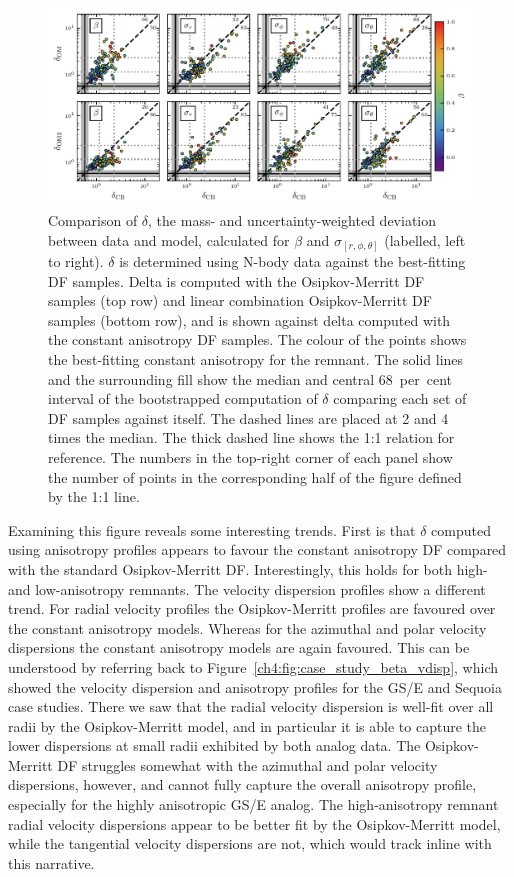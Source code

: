 \begin{figure}
    \centering
    \includegraphics[width=\textwidth]{figure/ch4/delta_comparison.pdf}
    \caption{Comparison of $\delta$, the mass- and uncertainty-weighted deviation between data and model, calculated for $\beta$ and $\sigma_{[r,\phi,\theta]}$ (labelled, left to right). $\delta$ is determined using N-body data against the best-fitting DF samples. Delta is computed with the Osipkov-Merritt DF samples (top row) and linear combination Osipkov-Merritt DF samples (bottom row), and is shown against delta computed with the constant anisotropy DF samples. The colour of the points shows the best-fitting constant anisotropy for the remnant. The solid lines and the surrounding fill show the median and central 68~per~cent interval of the bootstrapped computation of $\delta$ comparing each set of DF samples against itself. The dashed lines are placed at 2 and 4 times the median. The thick dashed line shows the 1:1 relation for reference. The numbers in the top-right corner of each panel show the number of points in the corresponding half of the figure defined by the 1:1 line.}
    \label{ch4:fig:delta-comparison}
\end{figure}

Examining this figure reveals some interesting trends. First is that $\delta$ computed using anisotropy profiles appears to favour the constant anisotropy DF compared with the standard Osipkov-Merritt DF. Interestingly, this holds for both high- and low-anisotropy remnants. The velocity dispersion profiles show a different trend. For radial velocity profiles the Osipkov-Merritt profiles are favoured over the constant anisotropy models. Whereas for the azimuthal and polar velocity dispersions the constant anisotropy models are again favoured. This can be understood by referring back to Figure~\ref{ch4:fig:case_study_beta_vdisp}, which showed the velocity dispersion and anisotropy profiles for the GS/E and Sequoia case studies. There we saw that the radial velocity dispersion is well-fit over all radii by the Osipkov-Merritt model, and in particular it is able to capture the lower dispersions at small radii exhibited by both analog data. The Osipkov-Merritt DF struggles somewhat with the azimuthal and polar velocity dispersions, however, and cannot fully capture the overall anisotropy profile, especially for the highly anisotropic GS/E analog. The high-anisotropy remnant radial velocity dispersions appear to be better fit by the Osipkov-Merritt model, while the tangential velocity dispersions are not, which would track inline with this narrative.

